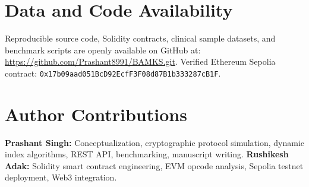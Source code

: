 \documentclass[conference]{IEEEtran}
\begin{document}
\section{Data and Code Availability}
Reproducible source code, Solidity contracts, clinical sample datasets, and benchmark scripts are openly available on GitHub at: \url{https://github.com/Prashant8991/BAMKS.git}. Verified Ethereum Sepolia contract: \texttt{0x17b09aad051BcD92EcfF3F08d87B1b333287cB1F}.

\section{Author Contributions}
\textbf{Prashant Singh:} Conceptualization, cryptographic protocol simulation, dynamic index algorithms, REST API, benchmarking, manuscript writing. \textbf{Rushikesh Adak:} Solidity smart contract engineering, EVM opcode analysis, Sepolia testnet deployment, Web3 integration.
\end{document}
